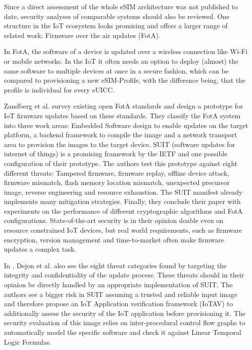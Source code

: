 Since a direct assessment of the whole eSIM architecture was not published to date, security analyses of comparable systems should also be reviewed. One structure in the IoT ecosystem looks promising and offers a larger range of related work: Firmware over the air updates (FotA).

In FotA, the software of a device is updated over a wireless connection like Wi-Fi or mobile networks. In the IoT it often needs an option to deploy (almost) the same software to multiple devices at once in a secure fashion, which can be compared to provisioning a new eSIM-Profile, with the difference being, that the profile is individual for every eUICC.

Zandberg et al. \parencite{Zandberg:SecFirmwareUpdatesforIoT} survey existing open FotA standards and design a prototype for IoT firmware updates based on these standards. They classify the FotA system into three work areas: Embedded Software design to enable updates on the target platform, a backend framework to compile the image and a network transport area to provision the images to the target device. SUIT (software updates for internet of things) is a promising framework by the IETF and one possible configuration of their prototype. The authors test this prototype against eight different threats: Tampered firmware, firmware replay, offline device attack, firmware mismatch, flash memory location mismatch, unexpected precursor image, reverse engineering and resource exhaustion. The SUIT manifest already implements many mitigation strategies. Finally, they conclude their paper with experiments on the performance of different cryptographic algorithms and FotA configurations. State-of-the-art security is in their opinion doable even on resource constrained IoT devices, but real world requirements, such as firmware encryption, version management and time-to-market often make firmware updates a complex task.

In \parencite{Dejon:AutomatedSecurityAnalysisofFotA}, Dejon et al. also see the eight threat categories found by \parencite{Zandberg:SecFirmwareUpdatesforIoT} targeting the integrity and confidentiality of the update process. These threats should in their opinion be directly handled by an appropriate implementation of SUIT. The authors see a bigger risk in SUIT assuming a trusted and reliable input image and therefore propose an IoT Application verification framework (IoTAV) to additionally assess the security of the IoT application before provisioning it. The security evaluation of this image relies on inter-procedural control flow graphs to automatically model the specific software and check it against Linear Temporal Logic Formulas.

